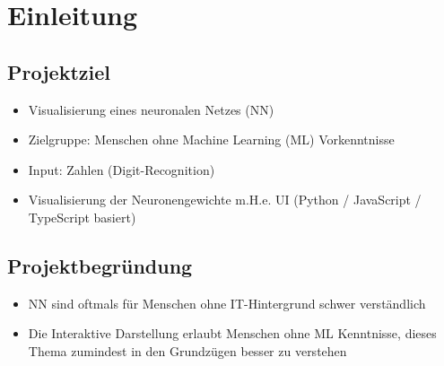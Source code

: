 \section{Einleitung}
\label{sec:Einleitung}


%
%
\subsection{Projektziel} 
\label{sec:Projektziel}
\begin{itemize}
	\item Visualisierung eines neuronalen Netzes (NN)
	\item Zielgruppe: Menschen ohne Machine Learning (ML) Vorkenntnisse 
	\item Input: Zahlen (Digit-Recognition)
	\item Visualisierung der Neuronengewichte m.H.e. UI (Python / JavaScript / TypeScript basiert)
\end{itemize}


\subsection{Projektbegründung} 
\label{sec:Projektbegruendung}
\begin{itemize}
	\item NN sind oftmals f\"ur Menschen ohne IT-Hintergrund schwer verst\"andlich
	\item Die Interaktive Darstellung erlaubt Menschen ohne ML Kenntnisse, dieses Thema zumindest in den Grundz\"ugen besser zu verstehen
\end{itemize}	

%



